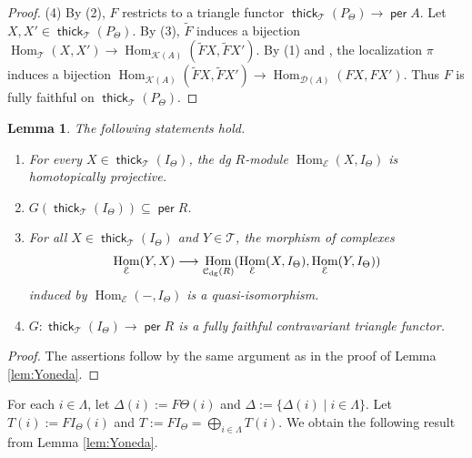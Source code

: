 \documentclass[a4paper,reqno,11pt]{amsart}
\numberwithin{equation}{section}
\newtheorem{lemma}[theorem]{Lemma}
\theoremstyle{definition}
\newcommand{\C}{\mathcal{C}}
\newcommand{\D}{\mathcal{D}}
\newcommand{\E}{\mathcal{E}}
\newcommand{\K}{\mathcal{K}}
\newcommand{\T}{\mathcal{T}}
\newcommand{\bte}{\Theta}
\newcommand{\bde}{\Delta}
\newcommand{\til}[1]{\widetilde{#1}}
\newcommand{\lto}{\longrightarrow}
\DeclareMathOperator{\thick}{\mathsf{thick}}
\DeclareMathOperator{\per}{\mathsf{per}}
\DeclareMathOperator{\Hom}{Hom}
\newcommand{\dgmod}{\C_{\mathrm{dg}}}
\begin{document}
\begin{proof}
(4) By (2), $F$ restricts to a triangle functor $\thick_{\T}(P_{\bte})\to\per A$.
Let $X,X'\in\thick_{\T}(P_{\bte})$.
By (3), $\til{F}$ induces a bijection $\Hom_{\T}(X,X')\to\Hom_{\K(A)}(\til{F}X,\til{F}X')$.
By (1) and \cite[3.1 and 4.1]{K94}, the localization $\pi$ induces a bijection $\Hom_{\K(A)}(\til{F}X,\til{F}X')\to\Hom_{\D(A)}(FX,FX')$.
Thus $F$ is fully faithful on $\thick_{\T}(P_{\bte})$.
\end{proof}

\begin{lemma}\label{lem:Yoneda_op}
The following statements hold.
\begin{enumerate}
\item For every $X\in\thick_{\T}(I_{\bte})$, the dg $R$-module $\Hom_{\E}(X,I_{\bte})$ is homotopically projective.
\item $G(\thick_{\T}(I_{\bte}))\subseteq\per R$.
\item For all $X\in\thick_{\T}(I_{\bte})$ and $Y\in\T$, the morphism of complexes
\begin{align}
\Hom_{\E}(Y,X)\lto\Hom_{\dgmod(R)}(\Hom_{\E}(X,I_{\bte}),\Hom_{\E}(Y,I_{\bte}))\notag
\end{align}
induced by $\Hom_{\E}(-,I_{\bte})$ is a quasi-isomorphism.
\item $G:\thick_{\T}(I_{\bte})\to\per R$ is a fully faithful contravariant triangle functor.
\end{enumerate}
\end{lemma}
\begin{proof}
The assertions follow by the same argument as in the proof of Lemma \ref{lem:Yoneda}.
\end{proof}

For each $i\in\Lambda$, let $\bde(i):=F\bte(i)$ and $\bde:=\{\bde(i)\mid i\in\Lambda\}$.
Let $T(i):=FI_{\bte}(i)$ and $T:=FI_{\bte}=\bigoplus_{i\in\Lambda}T(i)$.
We obtain the following result from Lemma \ref{lem:Yoneda}.
\end{document}
